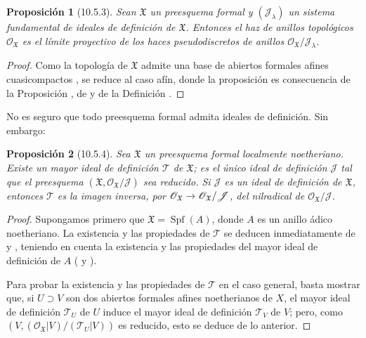 \documentclass[oneside]{amsart}
\theoremstyle{ega-env-style}
\theoremstyle{ega-thm-env-style}
\newtheorem*{proposition}{Proposición}
\theoremstyle{ega-defn-env-style}
\renewcommand{\to}{\mathchoice{\longrightarrow}{\rightarrow}{\rightarrow}{\rightarrow}}
\let\EGAOriginalLabel\label
\renewcommand{\label}[1]{\phantomsection\EGAOriginalLabel{#1}}
\begin{document}
\begin{proposition}[10.5.3]
\label{I.10.5.3}
Sean $\mathfrak{X}$ un preesquema formal y $(\mathscr{J}_\lambda)$ un sistema fundamental de ideales de definición de $\mathfrak{X}$.
Entonces el haz de anillos topológicos $\mathscr{O}_{\mathfrak{X}}$ es el límite proyectivo de los haces pseudodiscretos de anillos  $\mathscr{O}_{\mathfrak{X}}/\mathscr{J}_\lambda$.
\end{proposition}

\begin{proof}
Como la topología de $\mathfrak{X}$ admite una base de abiertos formales afines cuasicompactos , se reduce al caso afín, donde la proposición es consecuencia de la Proposición , de  y de la Definición .
\end{proof}

No es seguro que todo preesquema formal admita ideales de definición.
Sin embargo:
\begin{proposition}[10.5.4]
\label{I.10.5.4}
Sea $\mathfrak{X}$ un preesquema formal localmente noetheriano.
Existe un mayor ideal de definición $\mathscr{T}$ de $\mathfrak{X}$; es el único ideal de definición $\mathscr{J}$ tal que el preesquema $(\mathfrak{X},\mathscr{O}_{\mathfrak{X}}/\mathscr{J})$ sea reducido.
Si $\mathscr{J}$ es un ideal de definición de $\mathfrak{X}$, entonces $\mathscr{T}$ es la imagen inversa, por $\mathscr{O}_{\mathfrak{X}}\to
\mathscr{O}_{\mathfrak{X}}/\mathscr{J}$, del nilradical de $\mathscr{O}_{\mathfrak{X}}/\mathscr{J}$.
\end{proposition}

\begin{proof}
Supongamos primero que $\mathfrak{X}=\operatorname{Spf}(A)$, donde $A$ es un anillo ádico noetheriano.
La existencia y las propiedades de $\mathscr{T}$ se deducen inmediatamente de  y , teniendo en cuenta la existencia y las propiedades del mayor ideal de definición de $A$ ( y ).

Para probar la existencia y las propiedades de $\mathscr{T}$ en el caso general, basta mostrar que, si $U\supset V$ son dos abiertos formales afines noetherianos de $X$, el mayor ideal de definición $\mathscr{T}_U$ de $U$ induce el mayor ideal de definición $\mathscr{T}_V$ de $V$; pero, como $(V,(\mathscr{O}_{\mathfrak{X}}|V)/(\mathscr{T}_U|V))$ es reducido, esto se deduce de lo anterior.
\end{proof}
\end{document}
